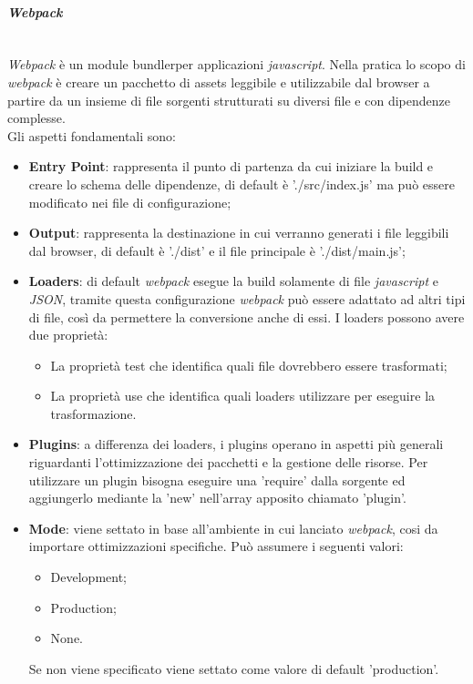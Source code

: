 \paragraph{\textit{Webpack}} \label{webpack}\-\\
\textit{Webpack} è un module bundler\glossario per applicazioni \textit{javascript}. Nella pratica lo scopo di \textit{webpack} è creare un pacchetto di assets leggibile e utilizzabile dal browser a partire da un insieme di file sorgenti strutturati su diversi file e con dipendenze complesse. \\
Gli aspetti fondamentali sono:
\begin{itemize}
	\item \textbf{Entry Point}: rappresenta il punto di partenza da cui iniziare la build e creare lo schema delle dipendenze, di default è './src/index.js' ma può essere modificato nei file di configurazione;
	\item \textbf{Output}: rappresenta la destinazione in cui verranno generati i file leggibili dal browser, di default è './dist' e il file principale è './dist/main.js';
	\item \textbf{Loaders}: di default \textit{webpack} esegue la build solamente di file \textit{javascript} e \textit{JSON}\glossario, tramite questa configurazione \textit{webpack} può essere adattato ad altri tipi di file, così da permettere la conversione anche di essi. I loaders possono avere due proprietà: 
	\begin{itemize}
		\item La proprietà test che identifica quali file dovrebbero essere trasformati;
		\item La proprietà use che identifica quali loaders utilizzare per eseguire la trasformazione.
	\end{itemize}
	\item \textbf{Plugins}: a differenza dei loaders, i plugins operano in aspetti più generali riguardanti l'ottimizzazione dei pacchetti e la gestione delle risorse. Per utilizzare un plugin bisogna eseguire una 'require' dalla sorgente ed aggiungerlo mediante la 'new' nell'array apposito chiamato 'plugin'.
	\item \textbf{Mode}: viene settato in base all'ambiente in cui lanciato \textit{webpack}, cosi da importare ottimizzazioni specifiche. Può assumere i seguenti valori:
	\begin{itemize}
		\item Development;
		\item Production;
		\item None.
	\end{itemize}
	Se non viene specificato viene settato come valore di default 'production'.
\end{itemize}

